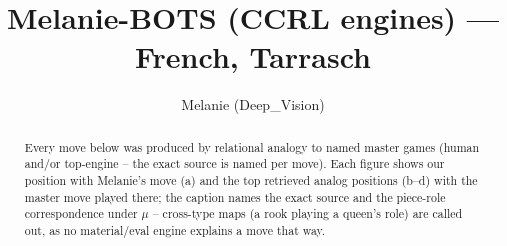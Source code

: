 \documentclass[11pt]{article}
\title{Melanie-BOTS (CCRL engines) — French, Tarrasch}
\author{Melanie (Deep\_Vision)}
\date{}
\begin{document}
\maketitle

\begin{abstract}Every move below was produced by relational analogy to named master games (human and/or top-engine -- the exact source is named per move). Each figure shows our position with Melanie's move (a) and the top retrieved analog positions (b--d) with the master move played there; the caption names the exact source and the piece-role correspondence under $\mu$ -- cross-type maps (a rook playing a queen's role) are called out, as no material/eval engine explains a move that way.\end{abstract}

\begin{figure}[p]\centering
\begin{subfigure}{0.46\textwidth}\centering
\resizebox{\linewidth}{!}{%
\newchessgame
\chessboard[
  setfen={r1bqkb1r/pp1n1ppp/2n1p3/2ppP3/3P2Q1/2PB4/PP1N1PPP/R1B1K1NR b KQkq - 2 7},
  showmover=false,
  pgfstyle=straightmove, color=movearrow, markmove={c5-d4}
]}
\caption{}
\end{subfigure}\hfill
\begin{subfigure}{0.46\textwidth}\centering
\resizebox{\linewidth}{!}{%
\newchessgame
\chessboard[
  setfen={rn1qkb1r/pp3ppp/2p1bn2/2Pp4/Q2P2P1/2N2P2/PP5P/R1B1KBNR b KQkq - 0 9},
  showmover=false,
  pgfstyle=straightmove, color=movearrow, markmove={f6-d7}
]}
\caption{}
\end{subfigure}
\\[4pt]
\begin{subfigure}{0.46\textwidth}\centering
\resizebox{\linewidth}{!}{%
\newchessgame
\chessboard[
  setfen={rnb1k2r/pp3ppp/1bp5/3p4/1PPNn2q/P3P3/R4PPP/1NBQKB1R w Kkq - 3 10},
  showmover=false,
  pgfstyle=straightmove, color=movearrow, markmove={c4-d5}
]}
\caption{}
\end{subfigure}\hfill
\begin{subfigure}{0.46\textwidth}\centering
\resizebox{\linewidth}{!}{%
\newchessgame
\chessboard[
  setfen={rn1qkb1r/p4ppp/1pp2n2/2Pp1b2/Q2P2P1/2N2P2/PP5P/R1B1KBNR b KQkq - 0 9},
  showmover=false,
  pgfstyle=straightmove, color=movearrow, markmove={f5-c8}
]}
\caption{}
\end{subfigure}

\end{figure}
\end{document}
